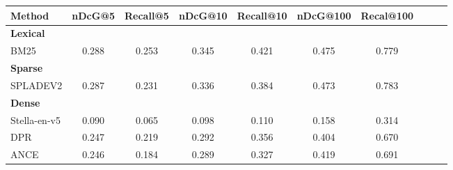 \begin{table*}[!ht]
    \centering
    \small
    \begin{tabular}{lccccccccc}
    \toprule
     \textbf{Method}& \multicolumn{1}{c}{nDcG@5} &\multicolumn{1}{c}{Recall@5} &\multicolumn{1}{c}{nDcG@10} & \multicolumn{1}{c}{Recall@10} & \multicolumn{1}{c}{nDcG@100} & \multicolumn{1}{c}{Recal@100} \\
     \midrule

     

    \midrule
    
    \textbf{Lexical} & & \\
            BM25 \cite{bm25} & 0.288 & 0.253 &0.345 & 0.421& 0.475&0.779 \\
          


     \midrule
     
      \textbf{Sparse} & & \\
            SPLADEV2 \cite{SPLADEv2} & 0.287 & 0.231& 0.336 & 0.384 & 0.473 & 0.783 \\
     \midrule
      \textbf{Dense} & & \\
            Stella-en-v5 & 0.090 & 0.065 & 0.098 & 0.110 & 0.158 & 0.314 \\
            DPR \cite{karpukhin-etal-2020-dense} & 0.247 &  0.219 & 0.292 & 0.356 & 0.404 & 0.670    \\
            ANCE \cite{ance} & 0.246 & 0.184  & 0.289 & 0.327 & 0.419 & 0.691\\
      



\end{tabular}
\end{table*}
